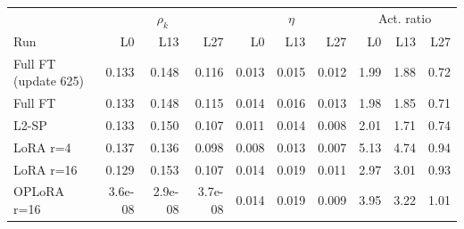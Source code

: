 \begin{tabular}{lrrrrrrrrr}
\toprule
 & \multicolumn{3}{c}{$\rho_k$} & \multicolumn{3}{c}{$\eta$} & \multicolumn{3}{c}{Act. ratio} \\
Run & L0 & L13 & L27 & L0 & L13 & L27 & L0 & L13 & L27 \\
\midrule
Full FT (update 625) & 0.133 & 0.148 & 0.116 & 0.013 & 0.015 & 0.012 & 1.99 & 1.88 & 0.72 \\
Full FT & 0.133 & 0.148 & 0.115 & 0.014 & 0.016 & 0.013 & 1.98 & 1.85 & 0.71 \\
L2-SP & 0.133 & 0.150 & 0.107 & 0.011 & 0.014 & 0.008 & 2.01 & 1.71 & 0.74 \\
LoRA r=4 & 0.137 & 0.136 & 0.098 & 0.008 & 0.013 & 0.007 & 5.13 & 4.74 & 0.94 \\
LoRA r=16 & 0.129 & 0.153 & 0.107 & 0.014 & 0.019 & 0.011 & 2.97 & 3.01 & 0.93 \\
OPLoRA r=16 & 3.6e-08 & 2.9e-08 & 3.7e-08 & 0.014 & 0.019 & 0.009 & 3.95 & 3.22 & 1.01 \\
\bottomrule
\end{tabular}
